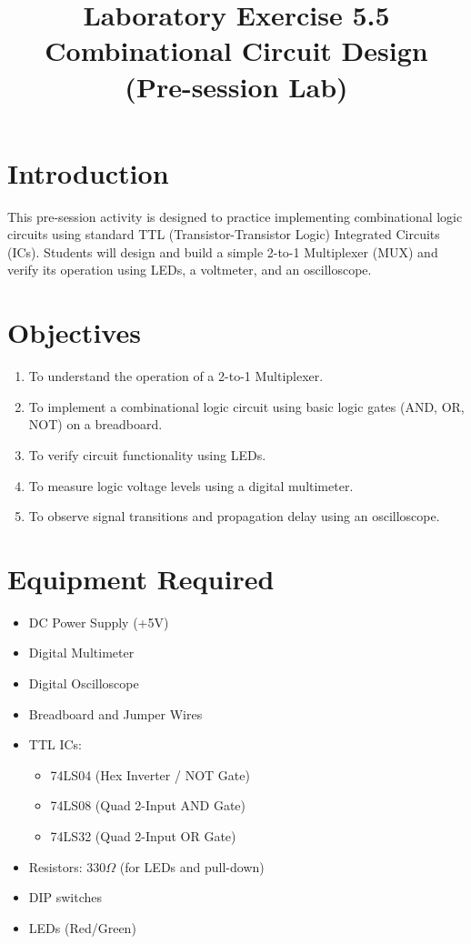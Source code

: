\documentclass{article}
\title{Laboratory Exercise 5.5 \\ Combinational Circuit Design (Pre-session Lab)}
\author{}
\date{}
\begin{document}
\maketitle

\section*{Introduction}
This pre-session activity is designed to practice implementing combinational logic circuits using standard TTL (Transistor-Transistor Logic) Integrated Circuits (ICs). Students will design and build a simple 2-to-1 Multiplexer (MUX) and verify its operation using LEDs, a voltmeter, and an oscilloscope.

\section*{Objectives}
\begin{enumerate}
    \item To understand the operation of a 2-to-1 Multiplexer.
    \item To implement a combinational logic circuit using basic logic gates (AND, OR, NOT) on a breadboard.
    \item To verify circuit functionality using LEDs.
    \item To measure logic voltage levels using a digital multimeter.
    \item To observe signal transitions and propagation delay using an oscilloscope.
\end{enumerate}

\section*{Equipment Required}
\begin{itemize}
    \item DC Power Supply (+5V)
    \item Digital Multimeter
    \item Digital Oscilloscope

    \item Breadboard and Jumper Wires
    \item TTL ICs:
    \begin{itemize}
        \item 74LS04 (Hex Inverter / NOT Gate)
        \item 74LS08 (Quad 2-Input AND Gate)
        \item 74LS32 (Quad 2-Input OR Gate)
    \end{itemize}
    \item Resistors: $330\Omega$ (for LEDs and pull-down)
    \item DIP switches
    \item LEDs (Red/Green)
\end{itemize}
\end{document}
